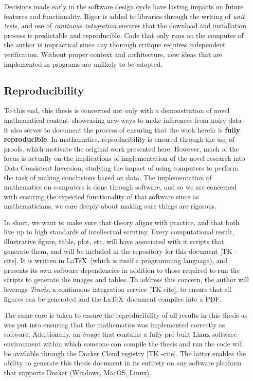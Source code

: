 Decisions made early in the software design cycle have lasting impacts on future features and functionality.
Rigor is added to libraries through the writing of \emph{unit tests}, and use of \emph{continous integration} ensures that the download and installation process is predictable and reproducible.
Code that only runs on the computer of the author is impractical since any thorough critique requires independent verification.
Without proper context and architecture, new ideas that are implemented in programs are unlikely to be adopted.

\subsection{Reproducibility}
To this end, this thesis is concerned not only with a demonstration of novel mathematical content\---showcasing new ways to make inferences from noisy data\---it also serves to document the process of ensuring that the work herein is \textbf{fully reproducible}.
In mathematics, reproducibility is ensured through the use of proofs, which motivate the original work presented here.
However, much of the focus is actually on the implications of implementation of the novel research into Data Consistent Inversion, studying the impact of using computers to perform the task of making conclusions based on data.
The implementation of mathematics on computers is done through software, and so we are concerned with ensuring the expected functionality of that software since as mathematicians, we care deeply about making sure things are rigorous.

In short, we want to make sure that theory aligns with practice, and that both live up to high standards of intellectual scrutiny.
Every computational result, illustrative figure, table, plot, etc. will have associated with it scripts that generate them, and will be included in the  repository for this document [TK - cite].
It is written in \LaTeX\, (which is itself a programming language), and presents its own software dependencies in addition to those required to run the scripts to generate the images and tables.
To address this concern, the author will leverage \emph{Travis}, a continuous integration service [TK-cite], to ensure that all figures can be generated and the \LaTeX\, document compiles into a PDF.

The same care is taken to ensure the reproducibility of all results in this thesis as was put into ensuring that the mathematics was implemented correctly as software.
Additionally, an \emph{image} that contains a fully pre-built Linux software environment within which someone can compile the thesis and run the code will be available through the Docker Cloud registry [TK -cite].
The latter enables the ability to generate this thesis document in its entirety on any software platform that supports Docker (Windows, MacOS, Linux).


